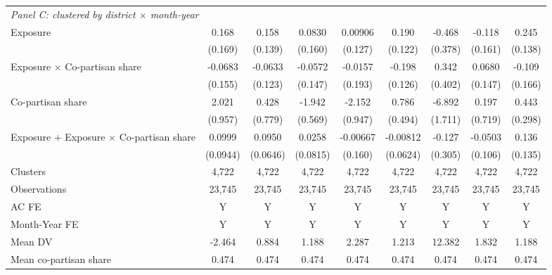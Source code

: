 {\begin{tabular}{l*{8}{c}}
\multicolumn{9}{l}{\textit{Panel C: clustered by district $\times$ month-year}} \\
Exposure    &       0.168         &       0.158         &      0.0830         &     0.00906         &       0.190         &      -0.468         &      -0.118         &       0.245\sym{*}  \\
            &     (0.169)         &     (0.139)         &     (0.160)         &     (0.127)         &     (0.122)         &     (0.378)         &     (0.161)         &     (0.138)         \\
Exposure $\times$ Co-partisan share&     -0.0683         &     -0.0633         &     -0.0572         &     -0.0157         &      -0.198         &       0.342         &      0.0680         &      -0.109         \\
            &     (0.155)         &     (0.123)         &     (0.147)         &     (0.193)         &     (0.126)         &     (0.402)         &     (0.147)         &     (0.166)         \\
Co-partisan share&       2.021\sym{**} &       0.428         &      -1.942\sym{***}&      -2.152\sym{**} &       0.786         &      -6.892\sym{***}&       0.197         &       0.443         \\
            &     (0.957)         &     (0.779)         &     (0.569)         &     (0.947)         &     (0.494)         &     (1.711)         &     (0.719)         &     (0.298)         \\

Exposure + Exposure $\times$ Co-partisan share&      0.0999         &      0.0950         &      0.0258         &    -0.00667         &    -0.00812         &      -0.127         &     -0.0503         &       0.136         \\
            &    (0.0944)         &    (0.0646)         &    (0.0815)         &     (0.160)         &    (0.0624)         &     (0.305)         &     (0.106)         &     (0.135)         \\
Clusters    &       4,722         &       4,722         &       4,722         &       4,722         &       4,722         &       4,722         &       4,722         &       4,722         \\
\midrule



Observations&      23,745&      23,745&      23,745&      23,745&      23,745&      23,745&      23,745&      23,745\\
AC FE       &           Y&           Y&           Y&           Y&           Y&           Y&           Y&           Y\\
Month-Year FE&           Y&           Y&           Y&           Y&           Y&           Y&           Y&           Y\\
Mean DV     &      -2.464&       0.884&       1.188&       2.287&       1.213&      12.382&       1.832&       1.188\\
Mean co-partisan share&       0.474&       0.474&       0.474&       0.474&       0.474&       0.474&       0.474&       0.474\\
\bottomrule
\end{tabular}
}
